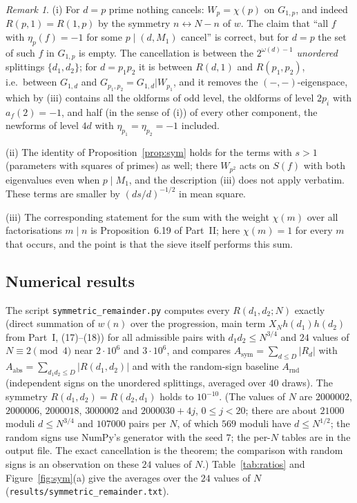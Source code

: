 \documentclass[11pt]{amsart}
\theoremstyle{remark}
\newtheorem{remark}[theorem]{Remark}
\begin{document}
\begin{remark}\label{rem:symrem}
(i) For $d=p$ prime nothing cancels: $W_p=\chi(p)$ on $G_{1,p}$, and indeed $R(p,1)=R(1,p)$ by the symmetry $n\leftrightarrow N-n$ of $w$. The claim that ``all $f$ with $\eta_p(f)=-1$ for some $p\mid(d,M_1)$ cancel'' is correct, but for $d=p$ the set of such $f$ in $G_{1,p}$ is empty. The cancellation is between the $2^{\omega(d)-1}$ \emph{unordered} splittings $\{d_1,d_2\}$; for $d=p_1p_2$ it is between $R(d,1)$ and $R(p_1,p_2)$, i.e.\ between $G_{1,d}$ and $G_{p_1,p_2}=G_{1,d}|W_{p_1}$, and it removes the $(-,-)$-eigenspace, which by (iii) contains all the oldforms of odd level, the oldforms of level $2p_i$ with $a_f(2)=-1$, and half (in the sense of (i)) of every other component, the newforms of level $4d$ with $\eta_{p_1}=\eta_{p_2}=-1$ included.

(ii) The identity of Proposition~\ref{prop:sym} holds for the terms with $s>1$ (parameters with squares of primes) as well; there $W_{p^2}$ acts on $S(f)$ with both eigenvalues even when $p\mid M_1$, and the description (iii) does not apply verbatim. These terms are smaller by $(ds/d)^{-1/2}$ in mean square.

(iii) The corresponding statement for the sum with the weight $\chi(m)$ over all factorisations $m\mid n$ is Proposition~6.19 of Part~II; here $\chi(m)=1$ for every $m$ that occurs, and the point is that the sieve itself performs this sum.
\end{remark}

\subsection{Numerical results}\label{subsec:symnum}
The script \texttt{symmetric\_remainder.py} computes every $R(d_1,d_2;N)$ exactly (direct summation of $w(n)$ over the progression, main term $X_Nh(d_1)h(d_2)$ from Part~I, (17)--(18)) for all admissible pairs with $d_1d_2\le N^{3/4}$ and $24$ values of $N\equiv2\pmod4$ near $2\cdot10^6$ and $3\cdot10^6$, and compares $A_{\mathrm{sym}}=\sum_{d\le D}|R_d|$ with $A_{\mathrm{abs}}=\sum_{d_1d_2\le D}|R(d_1,d_2)|$ and with the random-sign baseline $A_{\mathrm{rnd}}$ (independent signs on the unordered splittings, averaged over $40$ draws). The symmetry $R(d_1,d_2)=R(d_2,d_1)$ holds to $10^{-10}$. (The values of $N$ are $2000002$, $2000006$, $2000018$, $3000002$ and $2000030+4j$, $0\le j<20$; there are about $21000$ moduli $d\le N^{3/4}$ and $107000$ pairs per $N$, of which $569$ moduli have $d\le N^{1/2}$; the random signs use NumPy's generator with the seed $7$; the per-$N$ tables are in the output file. The exact cancellation is the theorem; the comparison with random signs is an observation on these $24$ values of $N$.) Table~\ref{tab:ratios} and Figure~\ref{fig:sym}(a) give the averages over the $24$ values of $N$ (\texttt{results/symmetric\_remainder.txt}).
\end{document}
